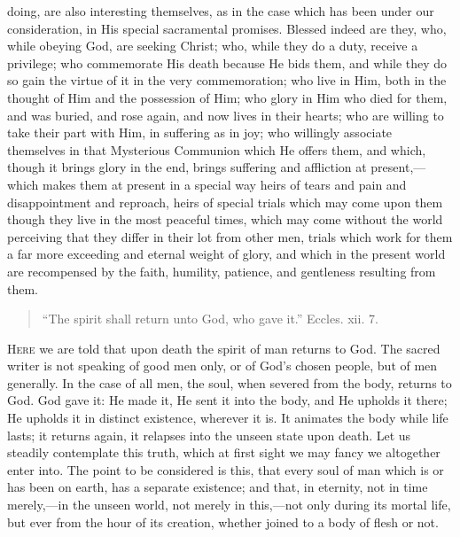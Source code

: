 doing, are also interesting themselves, as in the case which has been
under our consideration, in His special sacramental promises. Blessed
indeed are they, who, while obeying God, are seeking Christ; who,
while they do a duty, receive a privilege; who commemorate His death
because He bids them, and while they do so gain the virtue of it in
the very commemoration; who live in Him, both in the thought of Him
and the possession of Him; who glory in Him who died for them, and was
buried, and rose again, and now lives in their hearts; who are willing
to take their part with Him, in suffering as in joy; who willingly
associate themselves in that Mysterious Communion which He offers
them, and which, though it brings glory in the end, brings suffering
and affliction at present,—which makes them at present in a special
way heirs of tears and pain and disappointment and reproach, heirs of
special trials which may come upon them though they live in the most
peaceful times, which may come without the world perceiving that they
differ in their lot from other men, trials which work for them a far
more exceeding and eternal weight of glory, and which in the present
world are recompensed by the faith, humility, patience, and gentleness
resulting from them.


\begin{quote}

``The spirit shall return unto God, who gave it.''
Eccles. xii. 7.

\end{quote}

H\textsc{ere} we are told that upon death the spirit of man returns to God.
The sacred writer is not speaking of good men only, or of God's chosen
people, but of men generally. In the case of all men, the soul, when
severed from the body, returns to God. God gave it: He made it, He
sent it into the body, and He upholds it there; He upholds it in
distinct existence, wherever it is. It animates the body while life
lasts; it returns again, it relapses into the unseen state upon death.
Let us steadily contemplate this truth, which at first sight we may
fancy we altogether enter into. The point to be considered is this,
that every soul of man which is or has been on earth, has a separate
existence; and that, in eternity, not in time merely,—in the unseen
world, not merely in this,—not only during its mortal life, but ever
from the hour of its creation, whether joined to a body of flesh or
not.

